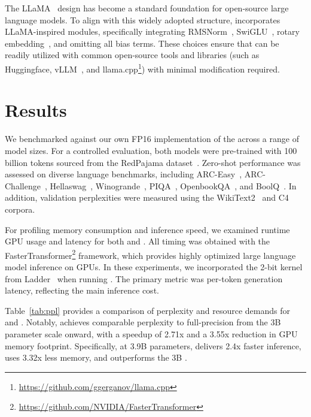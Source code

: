 The LLaMA~\cite{llama, llama2} design has become a standard foundation for open-source large language models. To align with this widely adopted structure,  incorporates LLaMA-inspired modules, specifically integrating RMSNorm~\cite{rmsnorm}, SwiGLU~\cite{swiglu}, rotary embedding~\cite{rope}, and omitting all bias terms. These choices ensure that  can be readily utilized with common open-source tools and libraries (such as Huggingface, vLLM~\cite{vllm}, and llama.cpp\footnote{\url{https://github.com/ggerganov/llama.cpp}}) with minimal modification required.

\section{Results}

We benchmarked  against our own FP16 implementation of the  across a range of model sizes. For a controlled evaluation, both models were pre-trained with 100 billion tokens sourced from the RedPajama dataset~\cite{redpajama}. Zero-shot performance was assessed on diverse language benchmarks, including ARC-Easy~\cite{arc}, ARC-Challenge~\cite{arc}, Hellaswag~\cite{hellaswag}, Winogrande~\cite{winoGrande}, PIQA~\cite{piqa}, OpenbookQA~\cite{openbookqa}, and BoolQ~\cite{boolq}. In addition, validation perplexities were measured using the WikiText2~\cite{wikitext2} and C4~\cite{c4} corpora.

For profiling memory consumption and inference speed, we examined runtime GPU usage and latency for both  and . All timing was obtained with the FasterTransformer\footnote{\url{https://github.com/NVIDIA/FasterTransformer}} framework, which provides highly optimized large language model inference on GPUs. In these experiments, we incorporated the 2-bit kernel from Ladder~\cite{ladder} when running . The primary metric was per-token generation latency, reflecting the main inference cost.

Table~\ref{tab:ppl} provides a comparison of perplexity and resource demands for  and . Notably,  achieves comparable perplexity to full-precision  from the 3B parameter scale onward, with a speedup of 2.71x and a 3.55x reduction in GPU memory footprint. Specifically, at 3.9B parameters,  delivers 2.4x faster inference, uses 3.32x less memory, and outperforms the 3B .

